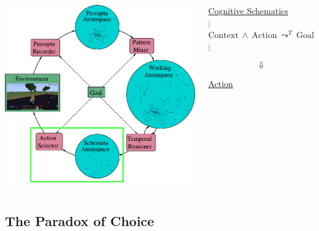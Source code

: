 \documentclass[aspectratio=169]{beamer}
\newcommand{\lpreimp}[1]{\leadsto^{#1}}
\begin{document}
\begin{frame}


  \begin{columns}
    \column{3.2in}
    \includegraphics[scale=0.3]{pictures/rocca-chart-action-highlight-v0.7.png}
    \column{2.5in}
    \begin{center}
      \underline{Cognitive Schematics}\\[0.2cm]
      $\vdots$ \\
      $\text{Context}\ \land\ \text{Action}\ \lpreimp{T}\
      \text{Goal}$ \\
      $\vdots$

      $$\Downarrow$$

      \underline{Action}
    \end{center}
  \end{columns}

\end{frame}

\subsection{The Paradox of Choice}
\end{document}
